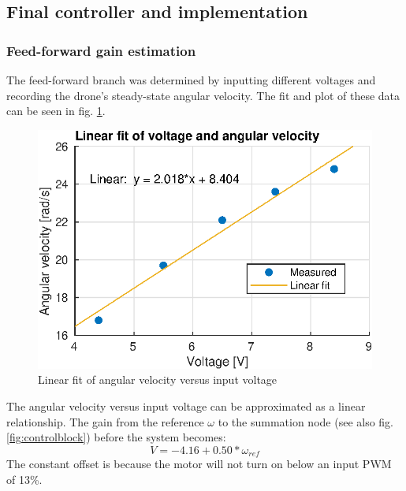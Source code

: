 \subsection{Final controller and implementation}
\subsubsection{Feed-forward gain estimation}
The feed-forward branch was determined by inputting different voltages and recording the drone's steady-state angular velocity. The fit and plot of these data can be seen in fig. \ref{fig:kfestimation}.
\begin{figure}[h!]
    \centering
    \includegraphics{figures/results/feedforwardfit.eps}
    \caption{Linear fit of angular velocity versus input voltage}
    \label{fig:kfestimation}
\end{figure}
The angular velocity versus input voltage can be approximated as a linear relationship. The gain from the reference $\omega$ to the summation node (see also fig. \ref{fig:controlblock}) before the system becomes:
\begin{equation}
    V = -4.16 + 0.50*\omega_{ref}
\end{equation}
The constant offset is because the motor will not turn on below an input PWM of 13\%.\\

